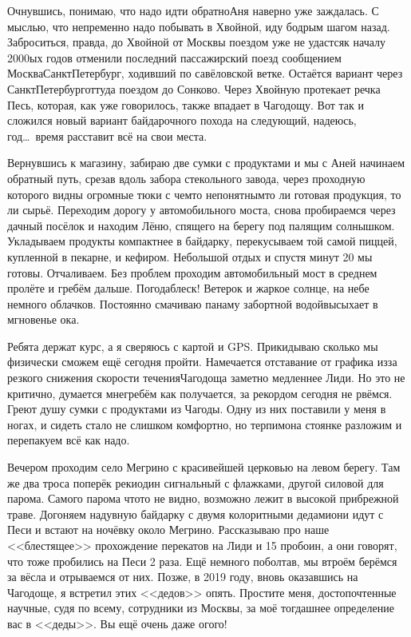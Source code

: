 Очнувшись, понимаю, что надо идти обратно\mdash Аня наверно уже заждалась. С мыслью, что непременно надо побывать в Хвойной, иду бодрым шагом назад. Заброситься, правда, до Хвойной от Москвы поездом уже не удастся\mdash к началу 2000\sdash ых годов отменили последний пассажирский поезд сообщением Москва\mdash Санкт\sdash Петербург, ходивший по савёловской ветке. Остаётся вариант через Санкт\sdash Петербург\mdash оттуда поездом до Сонково. Через Хвойную протекает речка Песь, которая, как уже говорилось, также впадает в Чагодощу. Вот так и сложился новый вариант байдарочного похода на следующий, надеюсь, год\ldots~время расставит всё на свои места.

Вернувшись к магазину, забираю две сумки с продуктами и мы с Аней начинаем обратный путь, срезав вдоль забора стекольного завода, через проходную которого видны огромные тюки с чем\sdash то непонятным\mdash то ли готовая продукция, то ли сырьё. Переходим дорогу у автомобильного моста, снова пробираемся через дачный посёлок и находим Лёню, спящего на берегу под палящим солнышком. Укладываем продукты компактнее в байдарку, перекусываем той самой пиццей, купленной в пекарне, и кефиром. Небольшой отдых и спустя минут 20 мы готовы. Отчаливаем. Без проблем проходим автомобильный мост в среднем пролёте и гребём дальше. Погода\mdash блеск! Ветерок и жаркое солнце, на небе немного облачков. Постоянно смачиваю панаму забортной водой\mdash высыхает в мгновенье ока. 

Ребята держат курс, а я сверяюсь с картой и GPS. Прикидываю сколько мы физически сможем ещё сегодня пройти. Намечается отставание от графика из\sdash за резкого снижения скорости течения\mdash Чагодоща заметно медленнее Лиди. Но это не критично, думается мне\mdash гребём как получается, за рекордом сегодня не рвёмся. Греют душу сумки с продуктами из Чагоды. Одну из них поставили у меня в ногах, и сидеть стало не слишком комфортно, но терпимо\mdash на стоянке разложим и перепакуем всё как надо. 

Вечером проходим село Мегрино с красивейшей церковью на левом берегу. Там же два троса поперёк реки\mdash один сигнальный с флажками, другой силовой для парома. Самого парома что\sdash то не видно, возможно лежит в высокой прибрежной траве. Догоняем надувную байдарку с двумя колоритными дедами\mdash они идут с Песи и встают на ночёвку около Мегрино. Рассказываю про наше <<блестящее>> прохождение перекатов на Лиди и 15 пробоин, а они говорят, что тоже пробились на Песи 2 раза. Ещё немного поболтав, мы втроём берёмся за вёсла и отрываемся от них. Позже, в 2019 году, вновь оказавшись на Чагодоще, я встретил этих <<дедов>> опять. Простите меня, достопочтенные научные, судя по всему, сотрудники из Москвы, за моё тогдашнее определение вас в <<деды>>. Вы ещё очень даже ого\sdash го!

